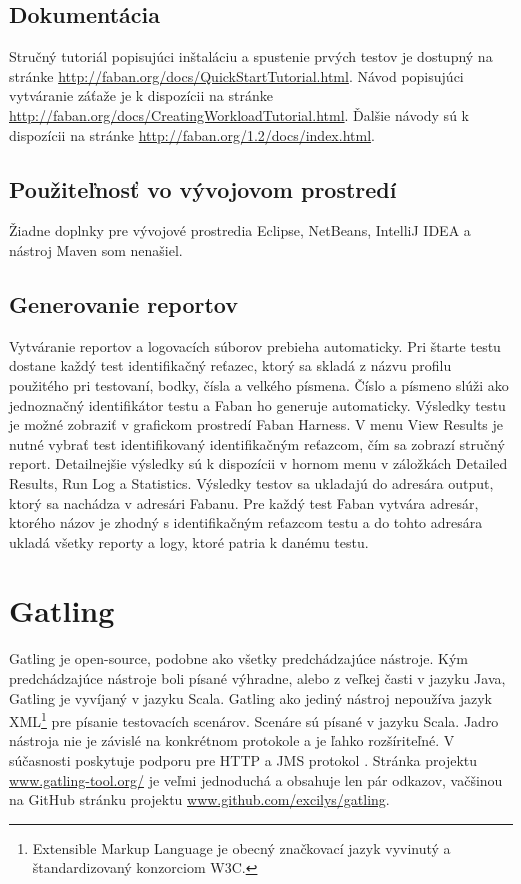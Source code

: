 \documentclass[12pt,oneside,final]{fithesis-utf8}
\begin{document}
\subsection{Dokumentácia}
Stručný tutoriál popisujúci inštaláciu a spustenie prvých testov je dostupný na stránke \url{http://faban.org/docs/QuickStartTutorial.html}. Návod popisujúci vytváranie záťaže je k dispozícii na stránke \url{http://faban.org/docs/CreatingWorkloadTutorial.html}. Ďalšie návody sú k dispozícii na stránke \url{http://faban.org/1.2/docs/index.html}.

\subsection{Použiteľnosť vo vývojovom prostredí}
Žiadne doplnky pre vývojové prostredia Eclipse, NetBeans, IntelliJ IDEA a nástroj Maven som nenašiel.

\subsection{Generovanie reportov}
Vytváranie reportov a logovacích súborov prebieha automaticky. Pri štarte testu dostane každý test identifikačný reťazec, ktorý sa skladá z názvu profilu použitého pri testovaní, bodky, čísla a velkého písmena. Číslo a písmeno slúži ako jednoznačný identifikátor testu a Faban ho generuje automaticky. Výsledky testu je možné zobraziť v grafickom prostredí Faban Harness. V menu View Results je nutné vybrať test identifikovaný identifikačným reťazcom, čím sa zobrazí stručný report. Detailnejšie výsledky sú k dispozícii v hornom menu v záložkách Detailed Results, Run Log a Statistics. Výsledky testov sa ukladajú do adresára output, ktorý sa nachádza v adresári Fabanu. Pre každý test Faban vytvára adresár, ktorého názov je zhodný s identifikačným reťazcom testu a do tohto adresára ukladá všetky reporty a logy, ktoré patria k danému testu.

\newpage
\section{Gatling}
Gatling je open-source, podobne ako všetky predchádzajúce nástroje. Kým predchádzajúce nástroje boli písané výhradne, alebo z veľkej časti v jazyku Java, Gatling je vyvíjaný v jazyku Scala. Gatling ako jediný nástroj nepoužíva jazyk XML\footnote{Extensible Markup Language je obecný značkovací jazyk vyvinutý a štandardizovaný konzorciom W3C.} pre písanie testovacích scenárov. Scenáre sú písané v jazyku Scala. Jadro nástroja nie je závislé na konkrétnom protokole a je ľahko rozšíriteľné. V súčasnosti poskytuje podporu pre HTTP a JMS protokol \cite{Gatling}. Stránka projektu \url{www.gatling-tool.org/} je veľmi jednoduchá a obsahuje len pár odkazov, vačšinou na GitHub stránku projektu \url{www.github.com/excilys/gatling}.
\end{document}
